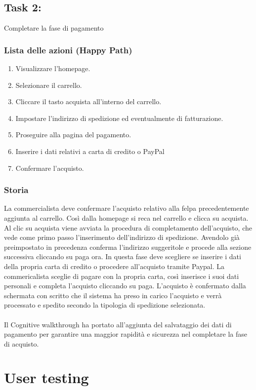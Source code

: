 \documentclass[12pt,a4paper]{report}
\begin{document}
\subsection*{Task 2:} Completare la fase di pagamento
\subsubsection{Lista delle azioni (Happy Path)}
\begin{enumerate}
  \item Visualizzare l'homepage.
  \item Selezionare il carrello.
  \item Cliccare il tasto acquista all'interno del carrello.
  \item Impostare l'indirizzo di spedizione ed eventualmente di fatturazione.
  \item Proseguire alla pagina del pagamento.
  \item Inserire i dati relativi a carta di credito o PayPal
  \item Confermare l'acquisto.
\end{enumerate}
\subsubsection{Storia}
La commercialista deve confermare l'acquisto relativo alla felpa precedentemente aggiunta al carrello. Così dalla homepage si reca nel carrello e clicca su acquista. Al clic su acquista viene avviata la procedura di completamento dell'acquisto, che vede come primo passo l'inserimento dell'indirizzo di spedizione. Avendolo già preimpostato in precedenza conferma l'indirizzo suggeritole e procede alla sezione successiva cliccando su paga ora. In questa fase deve scegliere se inserire i dati della propria carta di credito o procedere all'acquisto tramite Paypal. La commericalista sceglie di pagare con la propria carta, così inserisce i suoi dati personali e completa l'acquisto cliccando su paga. L'acquisto è confermato dalla schermata con scritto che il sistema ha preso in carico l'acquisto e verrà processato e spedito secondo la tipologia di spedizione selezionata.\\\\
Il Cognitive walkthrough ha portato all'aggiunta del salvataggio dei dati di pagamento per garantire una maggior rapidità e sicurezza nel completare la fase di acquisto.
\section{User testing}
\end{document}
